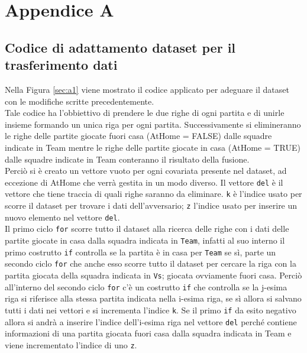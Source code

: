 \chapter{Appendice A}

\section{Codice di adattamento dataset per il trasferimento dati}

Nella Figura \ref{sec:a1} viene mostrato il codice applicato per adeguare il dataset con le modifiche scritte precedentemente.\\
Tale codice ha l'obbiettivo di prendere le due righe di ogni partita e di unirle insieme formando un unica riga per ogni partita. Successivamente si elimineranno le righe delle partite giocate fuori casa (\textsf{AtHome} = FALSE) dalle squadre indicate in \textsf{Team} mentre le righe delle partite giocate in casa (\textsf{AtHome} = TRUE) dalle squadre indicate in \textsf{Team} conteranno il risultato della fusione.\\
Perciò si è creato un vettore vuoto per ogni covariata presente nel dataset, ad eccezione di \textsf{AtHome} che verrà gestita in un modo diverso. Il vettore \texttt{del} è il vettore che tiene traccia di quali righe saranno da eliminare. \texttt{k} è l'indice usato per scorre il dataset per trovare i dati dell'avversario; \texttt{z} l'indice usato per inserire un nuovo elemento nel vettore \texttt{del}.\\
Il primo ciclo \texttt{for} scorre tutto il dataset alla ricerca delle righe con i dati delle partite giocate in casa dalla squadra indicata in \texttt{Team}, infatti al suo interno il primo costrutto \texttt{if} controlla se la partita è in casa per \texttt{Team} se sì, parte un secondo ciclo \texttt{for} che anche esso scorre tutto il dataset per cercare la riga con la partita giocata della squadra indicata in \texttt{Vs}; giocata ovviamente fuori casa. Perciò all'interno del secondo ciclo \texttt{for} c'è un costrutto \texttt{if} che controlla se la j-esima riga si riferisce alla stessa partita indicata nella i-esima riga, se sì allora si salvano tutti i dati nei vettori e si incrementa l'indice \texttt{k}. Se il primo \texttt{if} da esito negativo allora si andrà a inserire l'indice dell'i-esima riga nel vettore \texttt{del} perché contiene informazioni di una partita giocata fuori casa dalla squadra indicata in \textsf{Team} e viene incrementato l'indice di uno \texttt{z}.\\

